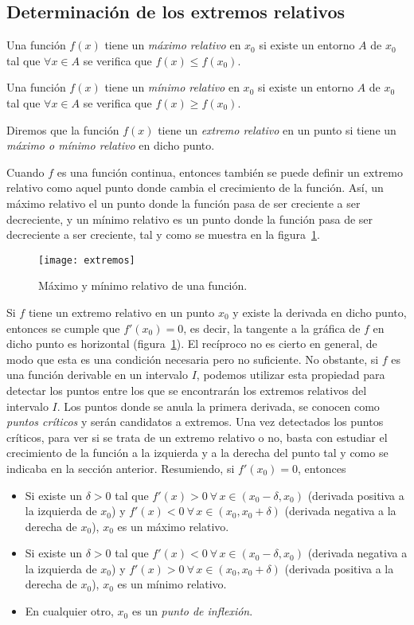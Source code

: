 \documentclass[a4paper]{article}
\begin{document}
\subsection*{Determinación de los extremos relativos}
Una función $f(x)$ tiene un \emph{máximo relativo} en $x_0$ si existe un entorno $A$ de $x_0$ tal que $\forall x \in A$ se verifica que $f(x)\leq f(x_0)$.

Una función $f(x)$ tiene un \emph{mínimo relativo} en $x_0$ si existe un entorno $A$ de $x_0$ tal que $\forall x\in A$ se verifica que $f(x)\geq f(x_0)$.

Diremos que la función $f(x)$ tiene un \emph{extremo relativo} en un punto si tiene un \emph{máximo o mínimo relativo} en dicho punto.

Cuando $f$ es una función continua, entonces también se puede definir un extremo relativo como aquel punto donde cambia el crecimiento de la función. Así, un máximo relativo el un punto donde la función pasa de ser creciente a ser decreciente, y un mínimo relativo es un punto donde la función pasa de ser decreciente a ser creciente, tal y como se muestra en la figura~\ref{g:extremos}.

\begin{figure}[h!]
\centering
\texttt{[image: extremos]}
\caption{Máximo y mínimo relativo de una función.}
\label{g:extremos}
\end{figure}

Si $f$ tiene un extremo relativo en un punto $x_0$ y existe la derivada en dicho punto, entonces se cumple que $f'(x_0)=0$, es decir, la tangente a la gráfica de $f$ en dicho punto es horizontal (figura~\ref{g:extremos}). El recíproco no es cierto en general, de modo que esta es una condición necesaria pero no suficiente. No obstante, si $f$ es una función derivable en un intervalo $I$, podemos utilizar esta propiedad para detectar los puntos entre los que se encontrarán los extremos relativos del intervalo $I$. Los puntos donde se anula la primera derivada, se conocen como \emph{puntos críticos} y serán candidatos a extremos. Una vez detectados los puntos críticos, para ver si se trata de un extremo relativo o no, basta con estudiar el crecimiento de la función a la izquierda y a la derecha del punto tal y como se indicaba en la sección anterior. Resumiendo, si $f'(x_0)=0$, entonces
\begin{itemize}
\item Si existe un $\delta>0$ tal que $f'(x)>0\ \forall\, x\in (x_0-\delta,x_0)$ (derivada positiva a la izquierda de $x_0$) y $f'(x)<0\ \forall\, x\in (x_0,x_0+\delta)$ (derivada negativa a la derecha de $x_0$), $x_0$ es un máximo relativo.

\item Si existe un $\delta>0$ tal que $f'(x)<0\ \forall\, x\in (x_0-\delta,x_0)$ (derivada negativa a la izquierda de $x_0$) y $f'(x)>0\ \forall\, x\in (x_0,x_0+\delta)$ (derivada positiva a la derecha de $x_0$), $x_0$ es un mínimo relativo.

\item En cualquier otro, $x_0$ es un \emph{punto de inflexión}.
\end{itemize}
\end{document}
